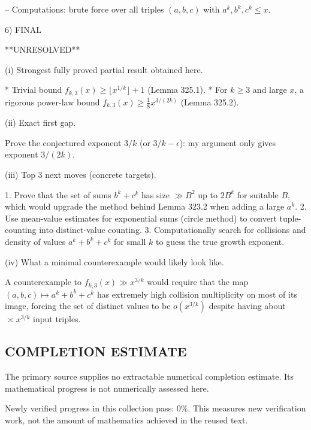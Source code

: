-- Computations: brute force over all triples $(a,b,c)$ with $a^k,b^k,c^k\le x$.


6) FINAL

**UNRESOLVED**

(i) Strongest fully proved partial result obtained here.

* Trivial bound $f_{k,3}(x)\ge \lfloor x^{1/k}\rfloor+1$ (Lemma 325.1).
* For $k\ge 3$ and large $x$, a rigorous power-law bound $f_{k,3}(x)\ge \tfrac18 x^{3/(2k)}$ (Lemma 325.2).

(ii) Exact first gap.

Prove the conjectured exponent $3/k$ (or $3/k-\epsilon$): my argument only gives exponent $3/(2k)$.

(iii) Top 3 next moves (concrete targets).

1. Prove that the set of sums $b^k+c^k$ has size $\gg B^2$ up to $2B^k$ for suitable $B$, which would upgrade the method behind Lemma 323.2 when adding a large $a^k$.
2. Use mean-value estimates for exponential sums (circle method) to convert tuple-counting into distinct-value counting.
3. Computationally search for collisions and density of values $a^k+b^k+c^k$ for small $k$ to guess the true growth exponent.

(iv) What a minimal counterexample would likely look like.

A counterexample to $f_{k,3}(x)\gg x^{3/k}$ would require that the map $(a,b,c)\mapsto a^k+b^k+c^k$ has extremely high collision multiplicity on most of its image, forcing the set of distinct values to be $o(x^{3/k})$ despite having about $\asymp x^{3/k}$ input triples.




\subsection*{COMPLETION ESTIMATE}
The primary source supplies no extractable numerical completion estimate. Its mathematical progress is not numerically assessed here.

Newly verified progress in this collection pass: $0\%$. This measures new verification work, not the amount of mathematics achieved in the reused text.
